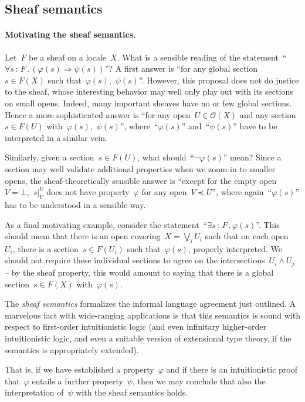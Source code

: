 \documentclass{ws-rv9x6}
\renewcommand{\O}{\mathcal{O}}
\renewcommand{\_}{\mathpunct{.}}
\newcommand{\?}{\,{:}\,}
\begin{document}
\subsection{Sheaf semantics}
\label{sect:sheaf-semantics}

\paragraph{Motivating the sheaf semantics.} Let~$F$ be a sheaf on a locale~$X$.
What is a sensible reading of the statement~``$\forall s\?F\_ (\varphi(s)
\Rightarrow \psi(s))$''? A first answer is ``for any global section~$s \in
F(X)$ such that~$\varphi(s)$,~$\psi(s)$''. However, this proposal does not do
justice to the sheaf, whose interesting behavior may well only play out with
its sections on small opens. Indeed, many important sheaves have no or few
global sections. Hence a more sophisticated answer is ``for any open~$U \in
\O(X)$ and any section~$s \in F(U)$ with~$\varphi(s)$,~$\psi(s)$'',
where~``$\varphi(s)$'' and~``$\psi(s)$'' have to be interpreted in a similar
vein.

Similarly, given a section~$s \in F(U)$, what should~``$\neg\varphi(s)$'' mean?
Since a section may well validate additional properties when we zoom in to
smaller opens, the sheaf-theoretically sensible answer is ``except for the
empty open~$V = \bot$,~$s|^U_V$ does not have property~$\varphi$ for any
open~$V \preceq U$'', where again~``$\varphi(s)$'' has to be understood in a
sensible way.

As a final motivating example, consider the statement~``$\exists s\?F\_
\varphi(s)$''. This should mean that there is an open covering~$X = \bigvee_i
U_i$ such that on each open~$U_i$, there is a section~$s \in F(U_i)$ such
that~$\varphi(s)$, properly interpreted. We should not require these individual
sections to agree on the intersections~$U_i \wedge U_j$ -- by the sheaf
property, this would amount to saying that there is a global section~$s \in
F(X)$ with~$\varphi(s)$.

The \emph{sheaf semantics} formalizes the informal language agreement just
outlined. A marvelous fact with wide-ranging applications is that this
semantics is sound with respect to first-order intuitionistic logic (and even
infinitary higher-order intuitionistic logic, and even a suitable version of
extensional type theory, if the semantics is appropriately extended).

That is, if we have established a property~$\varphi$ and if there is an
intuitionistic proof that~$\varphi$ entails a further property~$\psi$, then we
may conclude that also the interpretation of~$\psi$ with the sheaf semantics
holds.
\end{document}
